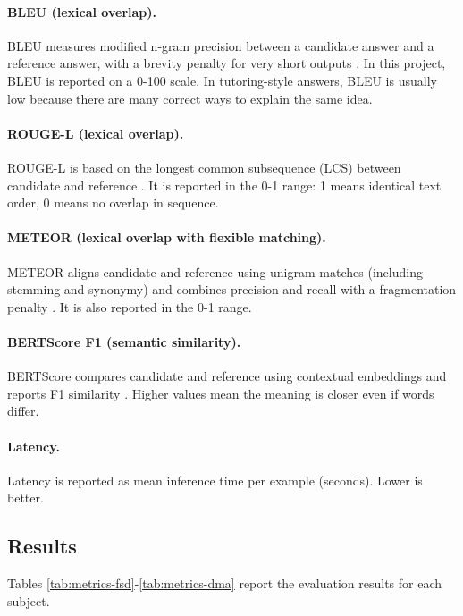 \paragraph{BLEU (lexical overlap).}
BLEU measures modified n-gram precision between a candidate answer and a reference answer, with a brevity penalty for very short outputs \parencite{BleuaMet4:online}. In this project, BLEU is reported on a 0-100 scale. In tutoring-style answers, BLEU is usually low because there are many correct ways to explain the same idea.

\paragraph{ROUGE-L (lexical overlap).}
ROUGE-L is based on the longest common subsequence (LCS) between candidate and reference \parencite{ROUGEAPa16:online}. It is reported in the 0-1 range: 1 means identical text order, 0 means no overlap in sequence.

\paragraph{METEOR (lexical overlap with flexible matching).}
METEOR aligns candidate and reference using unigram matches (including stemming and synonymy) and combines precision and recall with a fragmentation penalty \parencite{METEORAn22:online}. It is also reported in the 0-1 range.

\paragraph{BERTScore F1 (semantic similarity).}
BERTScore compares candidate and reference using contextual embeddings and reports F1 similarity \parencite{Zhang2019BERTScore}. Higher values mean the meaning is closer even if words differ. 

\paragraph{Latency.}
Latency is reported as mean inference time per example (seconds). Lower is better.

\subsection{Results}

Tables \ref{tab:metrics-fsd}-\ref{tab:metrics-dma} report the evaluation results for each subject.

